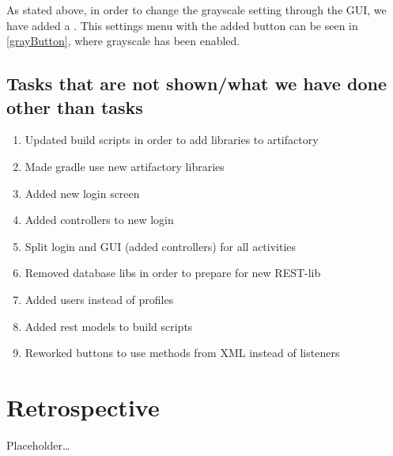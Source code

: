 As stated above, in order to change the grayscale setting through the GUI, we
have added a . This settings menu with the added button can
be seen in \autoref{grayButton}, where grayscale has been enabled. 


\subsection{Tasks that are not shown/what we have done other than tasks}
\begin{enumerate}
  \item Updated build scripts in order to add libraries to artifactory
  \item Made gradle use new artifactory libraries
  \item Added new login screen
  \item Added controllers to new login
  \item Split login and GUI (added controllers) for all activities
  \item Removed database libs in order to prepare for new REST-lib
  \item Added users instead of profiles
  \item Added rest models to build scripts
  \item Reworked buttons to use methods from XML instead of listeners
\end{enumerate}
















\section{Retrospective}
Placeholder\ldots